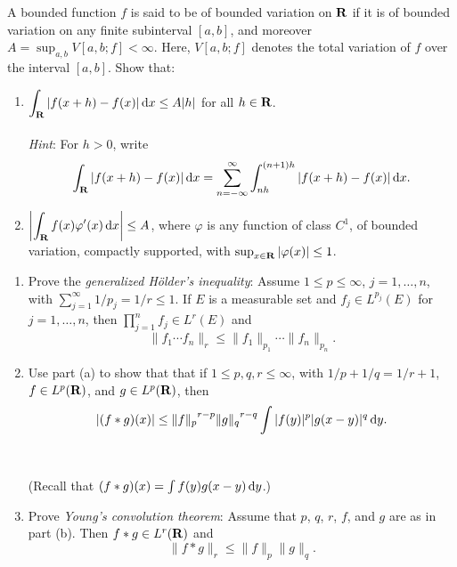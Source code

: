 \begin{problem}
  A bounded function \(f\) is said to be of bounded variation on \(\mathbf{R}\)
  if it is of bounded variation on any finite subinterval \([a,b]\), and
  moreover \(A=\sup_{a,b}V[a,b;f]<\infty\). Here, \(V[a,b;f]\) denotes the
  total variation of \(f\) over the interval \([a,b]\). Show that:
\begin{enumerate}[label=(\alph*),noitemsep]
\item \(\displaystyle\int_{\mathbf{R}}|f(x+h)-f(x)|\mathop{}\!\mathrm{d} x\leq A|h|\) for all
  \(h\in\mathbf{R}\).
  \\\\
  \emph{Hint}: For \(h>0\), write
\[
\int_{\mathbf{R}} |f(x+h)-f(x)|\mathop{}\!\mathrm{d} x=
\sum_{n=-\infty}^\infty\int_{nh}^{(n+1)h}|f(x+h)-f(x)|\mathop{}\!\mathrm{d} x.
\]
\item
  \(\displaystyle\left|\int_{\mathbf{R}} f(x)\varphi'(x)\mathop{}\!\mathrm{d} x\right|\leq A\),
  where \(\varphi\) is any function of class \(C^1\), of bounded variation,
  compactly supported, with \(\sup_{x\in\mathbf{R}}|\varphi(x)|\leq 1\).
\end{enumerate}
\end{problem}
\begin{solution}
\end{solution}

\begin{problem}
\begin{enumerate}[label=(\alph*),noitemsep]
\item Prove the \emph{generalized Hölder's inequality}: Assume
  \(1\leq p\leq\infty\), \(j=1,\dotsc,n\), with
  \(\sum_{j=1}^\infty 1/p_j=1/r\leq 1\). If \(E\) is a measurable set and
  \(f_j\in L^{p_j}(E)\) for \(j=1,\dotsc,n\), then
  \(\prod_{j=1}^n f_j\in L^r(E)\) and
    \[
      \|f_1\dotsm f_n\|_r\leq\|f_1\|_{p_1}\dotsm\|f_n\|_{p_n}.
    \]
  \item Use part (a) to show that that if \(1\leq p,q,r\leq\infty\), with
    \(1/p+1/q=1/r+1\), \(f\in L^p(\mathbf{R})\), and \(g\in L^p(\mathbf{R})\), then
\[
|(f*g)(x)|\leq{\|f\|_p}^{r-p}{\|g\|_q}^{r-q}\int|f(y)|^p|g(x-y)|^q\mathop{}\!\mathrm{d} y.
\]
\\\\
(Recall that \((f*g)(x)=\int f(y)g(x-y)\mathop{}\!\mathrm{d} y\).)
\item Prove \emph{Young's convolution theorem}: Assume that \(p\), \(q\),
  \(r\), \(f\), and \(g\) are as in part (b). Then \(f*g\in L^r(\mathbf{R})\) and
  \[
    \|f*g\|_r\leq\|f\|_p\|g\|_q.
  \]
\end{enumerate}
\end{problem}
\begin{solution}
\end{solution}

